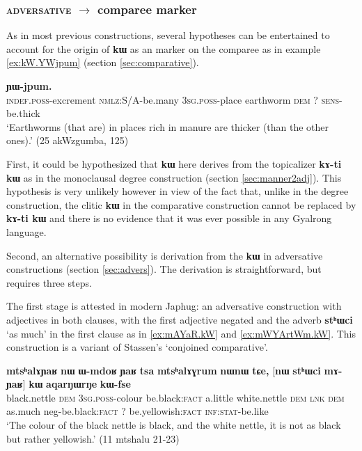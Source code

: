 \documentclass[oldfontcommands,oneside,a4paper,11pt]{article}
\newcommand{\ipa}[1]{{\phon\textbf{#1}}}
\begin{document}
 
 
  \subsubsection{\textsc{adversative} $\rightarrow$ comparee marker}
  As in most previous constructions, several hypotheses can be entertained to account for the origin of \ipa{kɯ} as an marker on the comparee as in example \ref{ex:kW.YWjpum}  (section \ref{sec:comparative}).
  
        \begin{exe}
  \ex  \label{ex:kW.YWjpum}  
  \gll 
  [\ipa{tɯ-ɣli} 	\ipa{kɯ-dɤn} 	\ipa{ɯ-stu} \ipa{qandʐe} 	\ipa{nɯ}] 	\ipa{kɯ} 	\ipa{ɲɯ-jpum.} \\
  \textsc{indef.poss}-excrement \textsc{nmlz}:S/A-be.many \textsc{3sg.poss}-place earthworm \textsc{dem} ?{ } \textsc{sens}-be.thick   \\
  \glt `Earthworms (that are) in places rich in manure are thicker (than the other ones).'
   (25 akWzgumba, 125)
   \end{exe} 

  First, it could be hypothesized that \ipa{kɯ} here derives from the topicalizer \ipa{kɤ-ti kɯ}  as in the monoclausal degree construction (section \ref{sec:manner2adj}). This hypothesis is very unlikely however in view of the fact that, unlike in the degree construction, the clitic \ipa{kɯ} in the comparative construction cannot be replaced by \ipa{kɤ-ti kɯ} and there is no evidence that it was ever  possible in any Gyalrong language.
  
  
Second, an alternative possibility is derivation from the \ipa{kɯ} in adversative constructions (section \ref{sec:advers}). The derivation is straightforward, but requires three steps.

The first stage is attested in modern Japhug: an adversative construction with adjectives in both  clauses, with the first adjective negated and the adverb \ipa{stʰɯci} `as much' in the first clause as in \ref{ex:mAYaR.kW} and \ref{ex:mWYArtWm.kW}.  This construction is a variant of Stassen's \citeyearpar{stassen11comparative} `conjoined comparative'.

        \begin{exe}
  \ex  \label{ex:mAYaR.kW}  
  \gll 
  \ipa{mtsʰalɤɲaʁ} 	\ipa{nɯ} 	\ipa{ɯ-mdoʁ} 	\ipa{ɲaʁ} 	\ipa{tsa} 	\ipa{mtsʰalɤɣrum} 	\ipa{nɯnɯ} 	\ipa{tɕe,} 	[\ipa{nɯ} \ipa{stʰɯci} 	\ipa{mɤ-ɲaʁ}] 	\ipa{kɯ}   	\ipa{aqarŋɯrŋe} 	\ipa{kɯ-fse} 	\\
  black.nettle \textsc{dem} \textsc{3sg.poss}-colour be.black:\textsc{fact} a.little   white.nettle \textsc{dem} \textsc{lnk} \textsc{dem} as.much neg-be.black:\textsc{fact}  ?{ } be.yellowish:\textsc{fact} \textsc{inf:stat}-be.like \\
  \glt `The colour of the black nettle is black, and the white nettle, it is not as  black but rather yellowish.'   (11 mtshalu 21-23)
        \end{exe}
        
\end{document}
